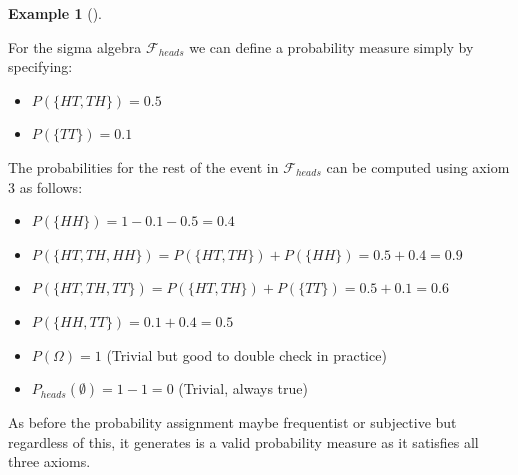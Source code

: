 \documentclass[
  letterpaper,
  DIV=11,
  numbers=noendperiod]{scrreport}
\providecommand{\tightlist}{%
  \setlength{\itemsep}{0pt}\setlength{\parskip}{0pt}}
\theoremstyle{definition}
\newtheorem{example}{Example}[chapter]
\theoremstyle{plain}
\theoremstyle{plain}
\theoremstyle{definition}
\theoremstyle{remark}
\begin{document}
\begin{tcolorbox}[enhanced jigsaw, opacitybacktitle=0.6, bottomtitle=1mm, opacityback=0, toprule=.15mm, colbacktitle=quarto-callout-note-color!10!white, colback=white, left=2mm, title={Probability measure for the number of heads in two coin flips}, breakable, rightrule=.15mm, leftrule=.75mm, titlerule=0mm, colframe=quarto-callout-note-color-frame, arc=.35mm, coltitle=black, toptitle=1mm, bottomrule=.15mm]

\begin{example}[]\protect\hypertarget{exm-probability-measure-heads}{}\label{exm-probability-measure-heads}

For the sigma algebra \(\mathcal F_{heads}\) we can define a probability
measure simply by specifying:

\begin{itemize}
\tightlist
\item
  \(P(\{HT,TH\}) = 0.5\)
\item
  \(P(\{TT\}) = 0.1\)
\end{itemize}

The probabilities for the rest of the event in \(\mathcal F_{heads}\)
can be computed using axiom 3 as follows:

\begin{itemize}
\tightlist
\item
  \(P(\{HH\}) = 1-0.1-0.5 = 0.4\)
\item
  \(P(\{HT,TH,HH\}) = P(\{HT,TH\}) + P(\{HH\}) = 0.5 + 0.4 = 0.9\)
\item
  \(P(\{HT,TH,TT\}) = P(\{HT,TH\}) + P(\{TT\})= 0.5 + 0.1 =0.6\)
\item
  \(P(\{HH,TT\}) = 0.1 +0.4 = 0.5\)
\item
  \(P(\Omega) = 1\) (Trivial but good to double check in practice)
\item
  \(P_{heads}(\emptyset) = 1-1=0\) (Trivial, always true)
\end{itemize}

As before the probability assignment maybe frequentist or subjective but
regardless of this, it generates is a valid probability measure as it
satisfies all three axioms.

\end{example}

\end{tcolorbox}
\end{document}
